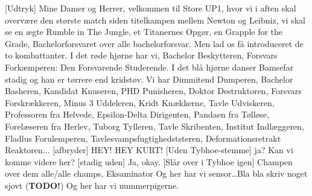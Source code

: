 \documentclass[a4paper,11pt]{article}
\begin{document}
\begin{sketch}


[Udtryk] Mine Damer og Herrer, velkommen til Store UP1, hvor vi i aften skal overvære den største match siden titelkampen mellem Newton og Leibniz, vi skal se en ægte Rumble in The Jungle, et Titanernes Opgør, en Grapple for the Grade, Bachelorforsvaret over alle bachelorforsvar. Men lad os få introduceret de to kombattanter.
I det røde hjørne har vi, Bachelor Beskytteren, Forsvars Forkæmperen: Den Forsvarende Studerende.
I det blå hjørne danser Bamsefar stadig og han er tørrere end kridstøv. Vi har Dimmitend Dumperen, Bachelor Basheren, Kandidat Knuseren, PHD Punisheren, Doktor Destruktoren, Forsvars Forskrækkeren, Minus 3 Uddeleren, Kridt Knækkerne, Tavle Udviskeren, Professoren fra Helvede, Epsilon-Delta Dirigenten, Pandaen fra Tølløse, Forelæseren fra Herlev, Tuborg Tylleren, Tavle Skribenten, Institut Indlæggeren, Fladlus Forulemperen, Tavlesvampsfugtighedststeren, Deformationsretrakt Reaktoren...
[afbryder] HEY! HEY KURT!
[Uden Tybhoe-stemme] ja?
 Kan vi komme videre her?
[stadig uden] Ja, okay.
[Slår over i Tybhoe igen] Champen over dem alle/alle champs, Eksaminator
 Og her har vi sensor\ldots Bla bla skriv noget sjovt (\textbf{TODO!})
Og her har vi nummerpigerne.

\end{sketch}
\end{document}
